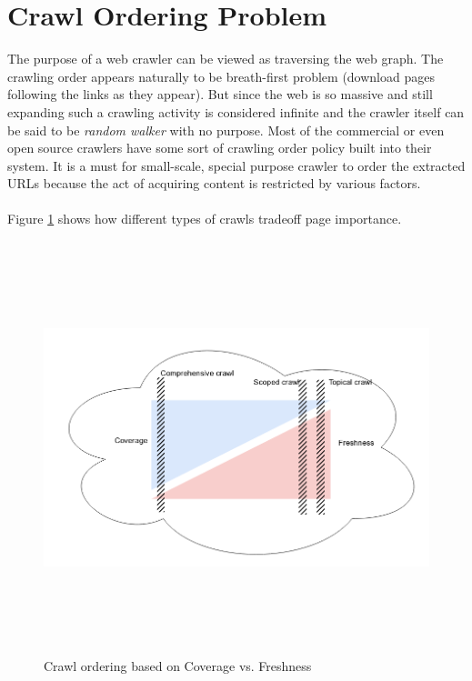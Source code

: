 

\section{Crawl Ordering Problem}
The purpose of a web crawler can be viewed as traversing the web graph. The crawling order appears naturally
to be breath-first problem (download pages following the links as they appear). But since the web is so
massive and still expanding such a crawling activity is considered infinite and the crawler itself can
be said to be \textit{random walker} with no purpose. Most of the commercial or even open source crawlers
have some sort of crawling order policy built into their system. It is a must for small-scale, special
purpose crawler to order the extracted URLs because the act of acquiring content is restricted by various
factors.
\\
\\
Figure \ref{fig:crawlorder} shows how different types of crawls tradeoff page importance.
\\
\begin{figure}[h!]
  \centering
  \includegraphics[width=15cm,height=12cm,keepaspectratio]{../media/crawler/crawl-ordering.png}
  \caption{Crawl ordering based on Coverage vs. Freshness}
  \label{fig:crawlorder}
\end{figure}

